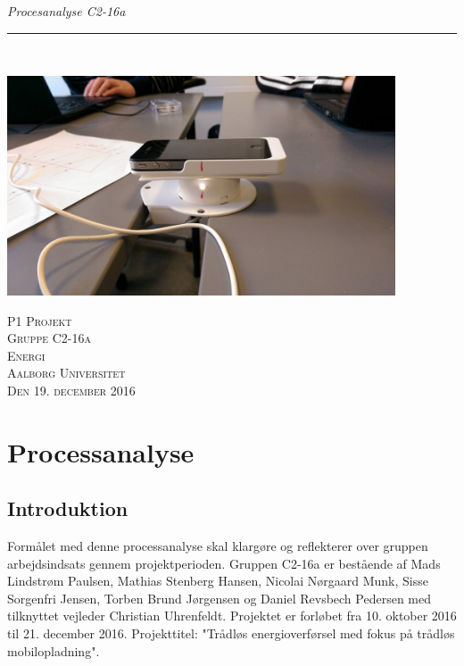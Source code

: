 
\raggedbottom

\thispagestyle{empty}
\begin{flushright}
\vspace{3cm}

\phantom{hul}

\phantom{hul}

\phantom{hul}

\textsl{\Huge Procesanalyse C2-16a} \\ \vspace{1cm}

\rule{13cm}{3mm} \\ \vspace{1.5cm}
\vspace{1cm}

\includegraphics[width=0.864\textwidth]{forsg2_opstilling}

\vspace{2cm} 
\textsc{\Large P1 Projekt \\
Gruppe C2-16a \\
Energi\\
Aalborg Universitet\\
Den 19. december 2016\\}
\end{flushright}

\newpage
\chapter{Processanalyse}
\section{Introduktion}

Formålet med denne processanalyse skal klargøre og reflekterer over gruppen arbejdsindsats gennem projektperioden. Gruppen C2-16a er bestående af Mads Lindstrøm Paulsen, Mathias Stenberg Hansen, Nicolai Nørgaard Munk, Sisse Sorgenfri Jensen, Torben Brund Jørgensen og Daniel Revsbech Pedersen med tilknyttet vejleder Christian Uhrenfeldt. Projektet er forløbet fra 10. oktober 2016 til 21. december 2016. Projekttitel: "Trådløs energioverførsel med fokus på trådløs mobilopladning".

